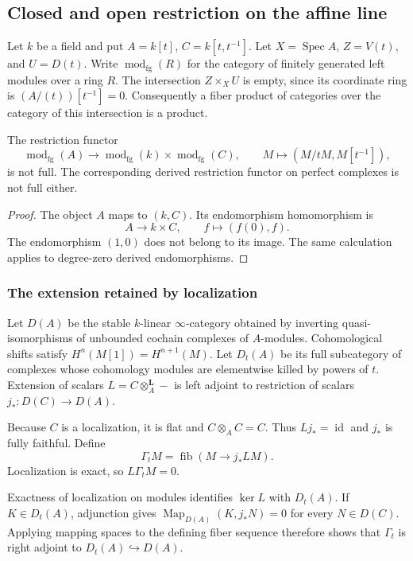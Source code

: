 \subsection{Closed and open restriction on the affine line}

Let $k$ be a field and put $A=k[t]$, $C=k[t,t^{-1}]$.
Let $X=\operatorname{Spec}A$, $Z=V(t)$, and $U=D(t)$.
Write $\operatorname{mod}_{\mathrm{fg}}(R)$ for the category of
finitely generated left modules over a ring $R$.
The intersection $Z\times_X U$ is empty, since its coordinate ring
is $(A/(t))[t^{-1}]=0$.
Consequently a fiber product of categories over the category of this
intersection is a product.

\begin{proposition}
\label{v4-arith:ic:w5-h:closed-open-failure}
The restriction functor
\[
 \operatorname{mod}_{\mathrm{fg}}(A)\longrightarrow
 \operatorname{mod}_{\mathrm{fg}}(k)\times
 \operatorname{mod}_{\mathrm{fg}}(C),\qquad
 M\longmapsto(M/tM,M[t^{-1}]),
\]
is not full. The corresponding derived restriction functor on
perfect complexes is not full either.
\end{proposition}
\begin{proof}
The object $A$ maps to $(k,C)$. Its endomorphism homomorphism is
\[
 A\longrightarrow k\times C,\qquad f\longmapsto(f(0),f).
\]
The endomorphism $(1,0)$ does not belong to its image.
The same calculation applies to degree-zero derived endomorphisms.
\end{proof}

\subsubsection{The extension retained by localization}

Let $D(A)$ be the stable $k$-linear $\infty$-category obtained by
inverting quasi-isomorphisms of unbounded cochain complexes of
$A$-modules. Cohomological shifts satisfy $H^n(M[1])=H^{n+1}(M)$.
Let $D_t(A)$ be its full subcategory of complexes whose cohomology
modules are elementwise killed by powers of $t$.
Extension of scalars $L=C\otimes_A^{\mathbf L}-$ is left adjoint
to restriction of scalars $j_*:D(C)\to D(A)$.

Because $C$ is a localization, it is flat and
$C\otimes_A C=C$. Thus $Lj_*=\operatorname{id}$ and $j_*$ is fully
faithful. Define
\[
 \Gamma_t M=\operatorname{fib}(M\longrightarrow j_*LM).
\]
Localization is exact, so $L\Gamma_tM=0$.

Exactness of localization on modules identifies $\ker L$ with
$D_t(A)$. If $K\in D_t(A)$, adjunction gives
$\operatorname{Map}_{D(A)}(K,j_*N)=0$ for every $N\in D(C)$.
Applying mapping spaces to the defining fiber sequence therefore
shows that $\Gamma_t$ is right adjoint to $D_t(A)\hookrightarrow D(A)$.

